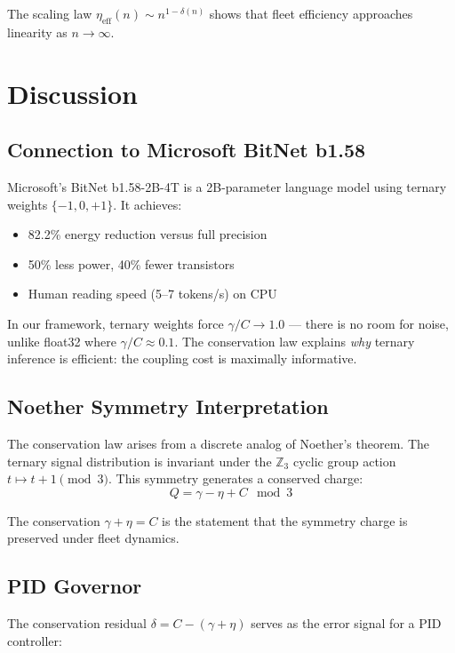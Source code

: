 \documentclass[11pt,a4paper]{article}
\newcommand{\trit}{\{-1,0,+1\}}
\newcommand{\C}{C}
\newcommand{\gammaCoord}{\gamma}
\newcommand{\etaVal}{\eta}
\begin{document}
The scaling law $\eta_{\text{eff}}(n) \sim n^{1 - \delta(n)}$ shows that fleet efficiency approaches linearity as $n \to \infty$.

\section{Discussion}

\subsection{Connection to Microsoft BitNet b1.58}

Microsoft's BitNet b1.58-2B-4T \cite{bitnet2024} is a 2B-parameter language model using ternary weights $\trit$. It achieves:
\begin{itemize}
\item 82.2\% energy reduction versus full precision
\item 50\% less power, 40\% fewer transistors
\item Human reading speed (5--7 tokens/s) on CPU
\end{itemize}

In our framework, ternary weights force $\gammaCoord/\C \to 1.0$ --- there is no room for noise, unlike float32 where $\gammaCoord/\C \approx 0.1$. The conservation law explains \emph{why} ternary inference is efficient: the coupling cost is maximally informative.

\subsection{Noether Symmetry Interpretation}

The conservation law arises from a discrete analog of Noether's theorem. The ternary signal distribution is invariant under the $\mathbb{Z}_3$ cyclic group action $t \mapsto t + 1 \pmod{3}$. This symmetry generates a conserved charge:
\begin{equation}
Q = \gammaCoord - \etaVal + \C \mod 3
\end{equation}

The conservation $\gammaCoord + \etaVal = \C$ is the statement that the symmetry charge is preserved under fleet dynamics.

\subsection{PID Governor}

The conservation residual $\delta = \C - (\gammaCoord + \etaVal)$ serves as the error signal for a PID controller:
\end{document}

